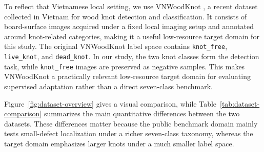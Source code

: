 \documentclass[10pt,a4paper]{article}
\begin{document}
To reflect that Vietnamese local setting, we use VNWoodKnot  \citep{TRAN2025112039}, a recent dataset collected in Vietnam for wood knot detection and classification. It consists of board-surface images acquired under a fixed local imaging setup and annotated around knot-related categories, making it a useful low-resource target domain for this study. The original VNWoodKnot label space contains \texttt{knot\_free}, \texttt{live\_knot}, and \texttt{dead\_knot}. In our study, the two knot classes form the detection task, while \texttt{knot\_free} images are preserved as negative samples. This makes VNWoodKnot a practically relevant low-resource target domain for evaluating supervised adaptation rather than a direct seven-class benchmark.


Figure~\ref{fig:dataset-overview} gives a visual comparison, while Table~\ref{tab:dataset-comparison} summarizes the main quantitative differences between the two datasets. These differences matter because the public benchmark domain mainly tests small-defect localization under a richer seven-class taxonomy, whereas the target domain emphasizes larger knots under a much smaller label space.
\end{document}
